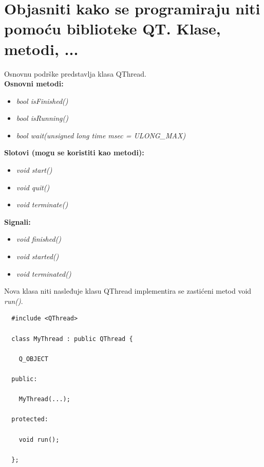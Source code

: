 \documentclass[a4paper]{article}
\begin{document}
\section{Objasniti kako se programiraju niti pomoću biblioteke QT. Klase, metodi, ...}
  \noindent Osnovnu podrške predstavlja klasa QThread. \\
  \textbf{Osnovni metodi:}
  \begin{itemize}
    \item \textit{bool isFinished()}
    \item \textit{bool isRunning()}
    \item \textit{bool wait(unsigned long time msec = ULONG\_MAX)}
  \end{itemize}
  \textbf{Slotovi (mogu se koristiti kao metodi):}
  \begin{itemize}
    \item \textit{void start()}
    \item \textit{void quit()}
    \item \textit{void terminate()}
  \end{itemize}
  \textbf{Signali:}
  \begin{itemize}
    \item \textit{void finished()}
    \item \textit{void started()}
    \item \textit{void terminated()}
  \end{itemize}
  Nova klasa niti nasleđuje klasu QThread implementira se zastićeni metod void \textit{run()}.\\
\begin{lstlisting}
  #include <QThread>

  class MyThread : public QThread {
  
    Q_OBJECT
  
  public:
  
    MyThread(...);
  
  protected:
  
    void run();
  
  };\end{lstlisting}
  
\end{document}
